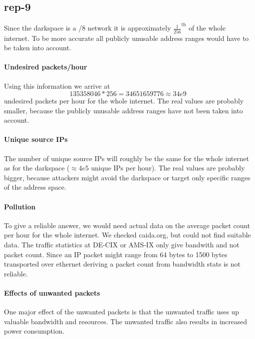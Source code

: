 \documentclass{article}
\begin{document}
\subsection{rep-9}

Since the darkspace is a /8 network it is approximately $\frac{1}{256}^{\text{th}}$ of the whole internet.
To be more accurate all publicly unusable address ranges would have to be taken into account.

\paragraph{Undesired packets/hour}
Using this information we arrive at
\[
    135358046 * 256 = 34651659776 \approx 34e9
\] undesired packets per hour for the whole internet. The real values are probably smaller, because
the publicly unusable address ranges have not been taken into account.

\paragraph{Unique source IPs}
The number of unique source IPs will roughly be the same for the whole internet as for the darkspace
($\approx 4e5$ unique IPs per hour).  The real values are probably bigger, because attackers might
avoid the darkspace or target only specific ranges of the address space.

\paragraph{Pollution}

To give a reliable answer, we would need actual data on the average packet count per hour for the
whole internet. We checked caida.org, but could not find suitable data. The traffic statistics at DE-CIX or
AMS-IX only give bandwith and not packet count. Since an IP packet might range from 64 bytes to 1500 bytes transported over ethernet deriving a packet count from bandwidth stats is not reliable.

\paragraph{Effects of unwanted packets}
One major effect of the unwanted packets is that the unwanted traffic uses up
valuable bandwidth and resources. The unwanted traffic also results in increased power consumption.
\end{document}
